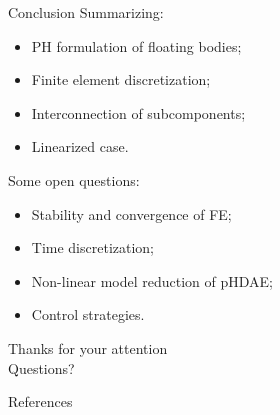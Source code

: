 \documentclass[aspectratio=169]{ISAE-Beamer}
\begin{document}
\begin{frame}{Conclusion}
Summarizing:
\begin{multicols}{2}
	\begin{itemize}
		\item PH formulation of floating bodies;
		\item Finite element discretization;
		\item Interconnection of subcomponents;
		\item Linearized case.
	\end{itemize}
\end{multicols}
	
Some open questions:
\begin{multicols}{2}
	\begin{itemize}
		\item Stability and convergence of FE;
		\item Time discretization;
		\item Non-linear model reduction of pHDAE;
		\item Control strategies.
	\end{itemize}
\end{multicols}

\end{frame}


\begin{frame}{}
\centering

\Huge Thanks for your attention \\
\Huge Questions?
\end{frame}

\begin{frame}[allowframebreaks]{References}
\printbibliography
\end{frame}
\end{document}
